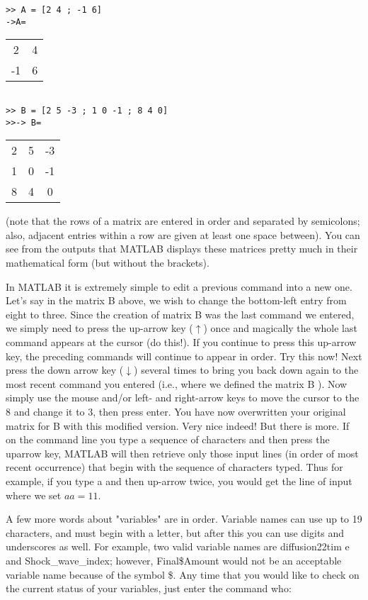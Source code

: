 \documentclass[../main.tex]{subfiles}
\begin{document}
\begin{verbatim}
>> A = [2 4 ; -1 6] 
->A= 
\end{verbatim}
\begin{tabular}{cc}
2&4\\
-1 &6 
\end{tabular} 

\begin{verbatim}

>> B = [2 5 -3 ; 1 0 -1 ; 8 4 0] 
>>-> B=
\end{verbatim}

\begin{tabular}{ccc}
2&5&-3\\
1&0&-1\\
8&4&0\\
\end{tabular} 

(note that the rows of a matrix are entered in order and separated by semicolons;
\noindent also, adjacent entries within a row are given at least one space between). You can
see from the outputs that MATLAB displays these matrices pretty much in their
mathematical form (but without the brackets). 

In MATLAB it is extremely simple to edit a previous command into a new one.
Let's say in the matrix B above, we wish to change the bottom-left entry from
eight to three. Since the creation of matrix B was the last command we entered,
we simply need to press the up-arrow key ($\uparrow$) once and magically the whole last
command appears at the cursor (do this!). If you continue to press this up-arrow
key, the preceding commands will continue to appear in order. Try this now!
Next press the down arrow key ($\downarrow$) several times to bring you back down again to
the most recent command you entered (i.e., where we defined the matrix B ). Now
simply use the mouse and/or left- and right-arrow keys to move the cursor to the 8
and change it to 3, then press enter. You have now overwritten your original
matrix for B with this modified version. Very nice indeed! But there is more. If
on the command line you type a sequence of characters and then press the uparrow key, MATLAB will then retrieve only those input lines (in order of most
recent occurrence) that begin with the sequence of characters typed. Thus for
example, if you type a and then up-arrow twice, you would get the line of input
where we set $aa = 11$.

A few more words about "variables" are in order. Variable names can use up to
19 characters, and must begin with a letter, but after this you can use digits and
underscores as well. For example, two valid variable names are
diffusion22tim e and Shock\_wave\_index; however, Final\$Amount
would not be an acceptable variable name because of the symbol \$. Any time that
you would like to check on the current status of your variables, just enter the
command who:
\end{document}
